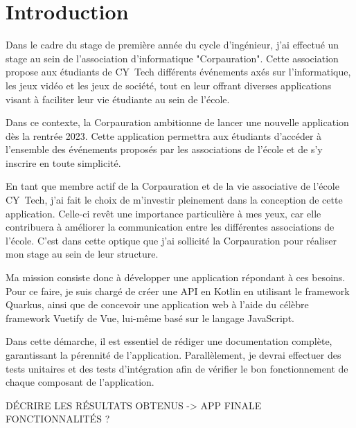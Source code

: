 
\section{Introduction}

Dans le cadre du stage de première année du cycle d'ingénieur, j'ai effectué un stage au sein de l'association d'informatique "Corpauration". Cette association propose aux étudiants de CY~Tech différents événements axés sur l'informatique, les jeux vidéo et les jeux de société, tout en leur offrant diverses applications visant à faciliter leur vie étudiante au sein de l'école.

Dans ce contexte, la Corpauration ambitionne de lancer une nouvelle application dès la rentrée 2023. Cette application permettra aux étudiants d'accéder à l'ensemble des événements proposés par les associations de l'école et de s'y inscrire en toute simplicité.

En tant que membre actif de la Corpauration et de la vie associative de l'école CY~Tech, j'ai fait le choix de m'investir pleinement dans la conception de cette application. Celle-ci revêt une importance particulière à mes yeux, car elle contribuera à améliorer la communication entre les différentes associations de l'école. C'est dans cette optique que j'ai sollicité la Corpauration pour réaliser mon stage au sein de leur structure.

\medskip

Ma mission consiste donc à développer une application répondant à ces besoins. Pour ce faire, je suis chargé de créer une API en Kotlin en utilisant le framework Quarkus, ainsi que de concevoir une application web à l'aide du célèbre framework Vuetify de Vue, lui-même basé sur le langage JavaScript.

Dans cette démarche, il est essentiel de rédiger une documentation complète, garantissant la pérennité de l'application. Parallèlement, je devrai effectuer des tests unitaires et des tests d'intégration afin de vérifier le bon fonctionnement de chaque composant de l'application.

\medskip

DÉCRIRE LES RÉSULTATS OBTENUS -> APP FINALE FONCTIONNALITÉS ?